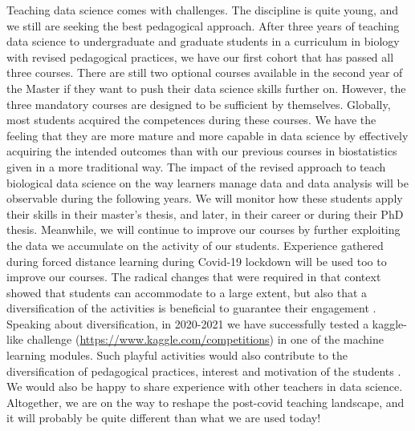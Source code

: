 \documentclass{aims}
\theoremstyle{definition}
\begin{document}
Teaching data science comes with challenges. The discipline is quite
young, and we still are seeking the best pedagogical approach. After
three years of teaching data science to undergraduate and graduate
students in a curriculum in biology with revised pedagogical practices,
we have our first cohort that has passed all three courses. There are
still two optional courses available in the second year of the Master if
they want to push their data science skills further on. However, the
three mandatory courses are designed to be sufficient by themselves.
Globally, most students acquired the competences during these courses.
We have the feeling that they are more mature and more capable in data
science by effectively acquiring the intended outcomes than with our
previous courses in biostatistics given in a more traditional way. The
impact of the revised approach to teach biological data science on the
way learners manage data and data analysis will be observable during the
following years. We will monitor how these students apply their skills
in their master's thesis, and later, in their career or during their PhD
thesis. Meanwhile, we will continue to improve our courses by further
exploiting the data we accumulate on the activity of our students.
Experience gathered during forced distance learning during Covid-19
lockdown will be used too to improve our courses. The radical changes
that were required in that context showed that students can accommodate
to a large extent, but also that a diversification of the activities is
beneficial to guarantee their engagement
\cite{Spadafora2018, Young2002}. Speaking about diversification, in
2020-2021 we have successfully tested a kaggle-like challenge
(\url{https://www.kaggle.com/competitions}) in one of the machine
learning modules. Such playful activities would also contribute to the
diversification of pedagogical practices, interest and motivation of the
students \cite{Alonso2019}. We would also be happy to share experience
with other teachers in data science. Altogether, we are on the way to
reshape the post-covid teaching landscape, and it will probably be quite
different than what we are used today!

\end{document}
